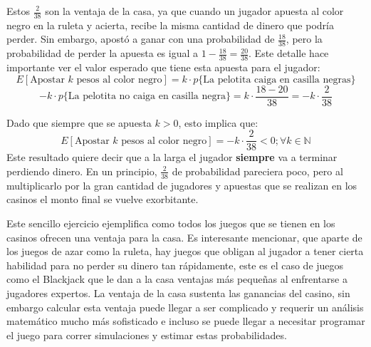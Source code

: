 Estos $\frac{2}{38}$ son la ventaja de la casa, ya que cuando un jugador apuesta al color negro en la ruleta y acierta, recibe la misma cantidad de dinero que podría perder. Sin embargo, apostó a ganar con una probabilidad de $\frac{18}{38}$, pero la probabilidad de perder la apuesta es igual a $1 - \frac{18}{38} = \frac{20}{38}$. Este detalle hace importante ver el valor esperado que tiene esta apuesta para el jugador:
\[E[\text{Apostar }k\text{ pesos al color negro}] = k  \cdot   p\{\text{La pelotita caiga en casilla negras}\} \]
\[- k  \cdot   p\{\text{La pelotita no caiga en casilla negra}\} = k \cdot \frac{18-20}{38}= - k \cdot \frac{2}{38}\]

Dado que siempre que se apuesta $k>0$, esto implica que:
\[E[\text{Apostar }k\text{ pesos al color negro}] = - k \cdot \frac{2}{38} < 0; \forall k \in \mathbb{N} \]
Este resultado quiere decir que a la larga el jugador \textbf{siempre} va a terminar perdiendo dinero.
En un principio, $\frac{2}{38}$ de probabilidad pareciera poco, pero al multiplicarlo por la gran cantidad de jugadores y apuestas que se realizan en los casinos el monto final se vuelve exorbitante.

Este sencillo ejercicio ejemplifica como todos los juegos que se tienen en los casinos ofrecen una ventaja para la casa. Es interesante mencionar, que aparte de los juegos de azar como la ruleta, hay juegos que obligan al jugador a tener cierta habilidad para no perder su dinero tan rápidamente, este es el caso de juegos como el Blackjack que le dan a la casa ventajas más pequeñas al enfrentarse a jugadores expertos. La ventaja de la casa sustenta las ganancias del casino, sin embargo calcular esta ventaja puede llegar a ser  complicado y requerir un análisis matemático mucho más sofisticado e incluso se puede llegar a necesitar programar el juego para correr simulaciones y estimar estas probabilidades.

